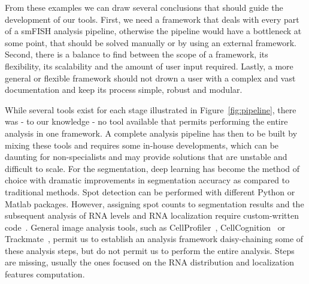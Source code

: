 From these examples we can draw several conclusions that should guide the development of our tools.
First, we need a framework that deals with every part of a \ac{smFISH} analysis pipeline, otherwise the pipeline would have a bottleneck at some point, that should be solved manually or by using an external framework.
Second, there is a balance to find between the scope of a framework, its flexibility, its scalability and the amount of user input required.
Lastly, a more general or flexible framework should not drown a user with a complex and vast documentation and keep its process simple, robust and modular.

While several tools exist for each stage illustrated in Figure~\ref{fig:pipeline}, there was - to our knowledge - no tool available that permits performing the entire analysis in one framework.
A complete analysis pipeline has then to be built by mixing these tools and requires some in-house developments, which can be daunting for non-specialists and may provide solutions that are unstable and difficult to scale.
For the segmentation, deep learning has become the method of choice with dramatic improvements in segmentation accuracy as compared to traditional methods.
Spot detection can be performed with different Python or Matlab packages.
However, assigning spot counts to segmentation results and the subsequent analysis of \ac{RNA} levels and RNA localization require custom-written code~\cite{stoeger_computer_2015, samacoits_computational_2018}.
General image analysis tools, such as CellProfiler~\cite{mcquin_cellprofiler_2018}, CellCognition~\cite{held_cellcognition_2010} or Trackmate~\cite{ershov_bringing_2021}, permit us to establish an analysis framework daisy-chaining some of these analysis steps, but do not permit us to perform the entire analysis.
Steps are missing, usually the ones focused on the \ac{RNA} distribution and localization features computation.

